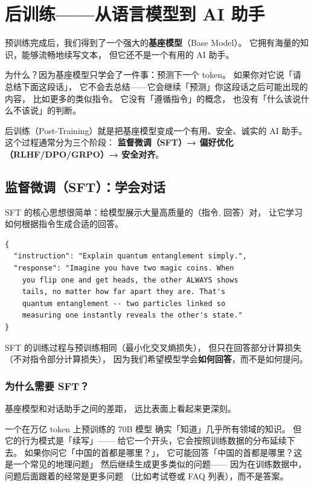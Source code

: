 \chapter{后训练——从语言模型到 AI 助手}
\label{ch:post-training}

预训练完成后，我们得到了一个强大的\textbf{基座模型}（Base Model）。
它拥有海量的知识，能够流畅地续写文本，
但它还不是一个有用的 AI 助手。

为什么？因为基座模型只学会了一件事：预测下一个 token。
如果你对它说「请总结下面这段话」，
它不会去总结——它会继续「预测」你这段话之后可能出现的内容，
比如更多的类似指令。
它没有「遵循指令」的概念，
也没有「什么该说什么不该说」的判断。

后训练（Post-Training）就是把基座模型变成一个有用、安全、诚实的 AI 助手。
这个过程通常分为三个阶段：
\textbf{监督微调（SFT）→ 偏好优化（RLHF/DPO/GRPO）→ 安全对齐}。

\section{监督微调（SFT）：学会对话}

SFT 的核心思想很简单：给模型展示大量高质量的（指令, 回答）对，
让它学习如何根据指令生成合适的回答。

\begin{lstlisting}[caption={SFT data format example}]
{
  "instruction": "Explain quantum entanglement simply.",
  "response": "Imagine you have two magic coins. When
    you flip one and get heads, the other ALWAYS shows
    tails, no matter how far apart they are. That's
    quantum entanglement -- two particles linked so
    measuring one instantly reveals the other's state."
}
\end{lstlisting}

SFT 的训练过程与预训练相同（最小化交叉熵损失），
但只在回答部分计算损失（不对指令部分计算损失），
因为我们希望模型学会\textbf{如何回答}，而不是如何提问。

\subsection{为什么需要 SFT？}

基座模型和对话助手之间的差距，
远比表面上看起来更深刻。

一个在万亿 token 上预训练的 70B 模型
确实「知道」几乎所有领域的知识。
但它的行为模式是「续写」——
给它一个开头，它会按照训练数据的分布延续下去。
如果你问它「中国的首都是哪里？」，
它可能回答「中国的首都是哪里？这是一个常见的地理问题」
然后继续生成更多类似的问题——
因为在训练数据中，问题后面跟着的经常是更多问题
（比如考试卷或 FAQ 列表），而不是答案。

